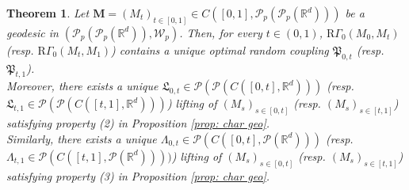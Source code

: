 \documentclass[10pt,leqno]{amsart}
\numberwithin{equation}{section}
\newtheorem{teorema}{Theorem}[section]
\newcommand{\R}{\mathbb{R}}
\newcommand{\PP}{\mathcal{P}}
\begin{document}
\begin{teorema}
    Let $\boldsymbol{M} = (M_t)_{t\in[0,1]} \in C([0,1],\PP_p(\PP_p(\R^d)))$ be a geodesic in $(\PP_p(\PP_p(\R^d)),\mathcal{W}_p)$. Then, for every $t\in(0,1)$, $\mathrm{R}\Gamma_0(M_0,M_t)$ (resp. $\mathrm{R}\Gamma_0(M_t,M_1)$) contains a unique optimal random coupling $\mathfrak{P}_{0,t}$ (resp. $\mathfrak{P}_{t,1}$). 
    \\
    Moreover, there exists a unique $\mathfrak{L}_{0,t} \in \PP(\PP(C([0,t],\R^d)))$ (resp. $\mathfrak{L}_{t,1} \in \PP(\PP(C([t,1],\R^d)))$) lifting of $(M_s)_{s\in[0,t]}$ (resp. $(M_s)_{s\in[t,1]}$) satisfying property (2) in Proposition \ref{prop: char geo}.
    \\
    Similarly, there exists a unique $\Lambda_{0,t} \in \PP(C([0,t],\PP(\R^d)))$ (resp. $\Lambda_{t,1}\in \PP(C([t,1],\PP(\R^d))))$) lifting of $(M_s)_{s\in[0,t]}$ (resp. $(M_s)_{s\in[t,1]}$) satisfying property (3) in Proposition \ref{prop: char geo}.
\end{teorema}
\end{document}
